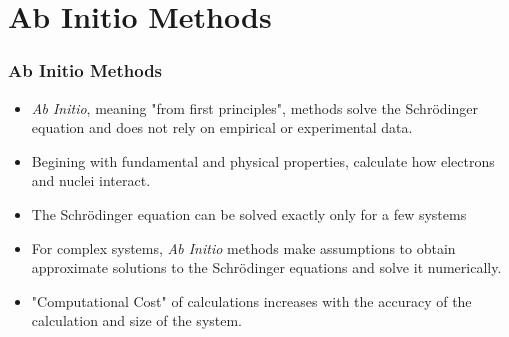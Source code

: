\documentclass[slidestop,mathserif,compress,xcolor=svgnames]{beamer}
\begin{document}
\section{Ab Initio Methods}
\begin{frame}
  \frametitle{\small Ab Initio Methods}
  \begin{block}{}
    \begin{itemize}
      \item \emph{Ab Initio}, meaning "from first principles", methods solve the Schr\"{o}dinger equation and does not rely on empirical or experimental data. 
      \item Begining with fundamental and physical properties, calculate how electrons and nuclei interact.
      \item The Schr\"{o}dinger equation can be solved exactly only for a few systems
      \item For complex systems, \emph{Ab Initio} methods make assumptions to obtain approximate solutions to the  Schr\"{o}dinger equations and solve it numerically.
      \item "Computational Cost" of calculations increases with the accuracy of the calculation and size of the system.
    \end{itemize}
  \end{block}
\end{frame}
\end{document}
